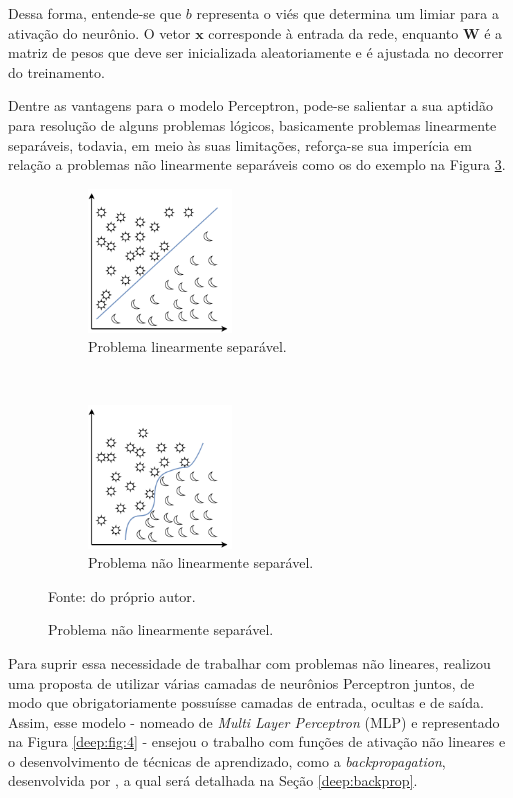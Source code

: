 Dessa forma, entende-se que $b$ representa o viés que determina um limiar para a ativação do neurônio. O vetor $\textbf{x}$ corresponde à entrada da rede, enquanto $\textbf{W}$ é a matriz de pesos que deve ser inicializada aleatoriamente e é ajustada no decorrer do treinamento.

Dentre as vantagens para o modelo Perceptron, pode-se salientar a sua aptidão para resolução de alguns problemas lógicos, basicamente problemas linearmente separáveis, todavia, em meio às suas limitações, reforça-se sua imperícia em relação a problemas não linearmente separáveis como os do exemplo na Figura \ref{deep:fig:3.2}.

\begin{figure}[H]
   \caption[Problemas de separabilidade.]{Representação de problemas linearmente e não linearmente separáveis.}
   \centering
   \label{deep:fig:3}
    \begin{subfigure}[t]{0.45\textwidth}
        \centering
        \includegraphics[height=1.5in]{recursos/imagens/deep/l_separavel.png}
        \caption{Problema linearmente separável.}
        \label{deep:fig:3.1}
    \end{subfigure}%
    ~ 
    \begin{subfigure}[t]{0.45\textwidth}
        \centering
        \includegraphics[height=1.5in]{recursos/imagens/deep/nl_separavel.png}
        \caption{Problema não linearmente separável.}
        \label{deep:fig:3.2}
    \end{subfigure}%

    Fonte: do próprio autor.
\end{figure}


Para suprir essa necessidade de trabalhar com problemas não lineares, \cite{Werbos:74} realizou uma proposta de utilizar várias camadas de neurônios Perceptron juntos, de modo que obrigatoriamente possuísse camadas de entrada, ocultas e de saída. Assim, esse modelo - nomeado de \textit{Multi Layer Perceptron} (MLP) \citep{Werbos:74} e representado na Figura \ref{deep:fig:4} - ensejou o trabalho com funções de ativação não lineares e o desenvolvimento de técnicas de aprendizado, como a \textit{backpropagation}, desenvolvida por \cite{rumelhart1986learning}, a qual será detalhada na Seção \ref{deep:backprop}.


